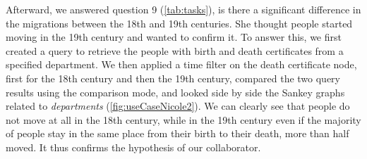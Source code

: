 Afterward, we answered question 9 (\autoref{tab:tasks}), \ie is there a significant difference in the migrations between the 18th and 19th centuries.
She thought people started moving in the 19th century and wanted to confirm it.
To answer this, we first created a query to retrieve the people with birth and death certificates from a specified department.
We then applied a time filter on the death certificate node, first for the 18th century and then the 19th century, compared the two query results using the comparison mode, and looked side by side the Sankey graphs related to \textit{departments} (\autoref{fig:useCaseNicole2}).
We can clearly see that people do not move at all in the 18th century, while in the 19th century even if the majority of people stay in the same place from their birth to their death, more than half moved.
It thus confirms the hypothesis of our collaborator.

